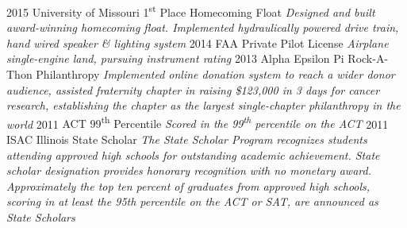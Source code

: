\documentclass[print]{gunn-resume}
\begin{document}
\begin{entrylist}
  \entry
    {2015}
    {University of Missouri 1\textsuperscript{st} Place Homecoming Float}
    {}
    {\emph{Designed and built award-winning homecoming float. Implemented hydraulically powered drive train, hand wired speaker \& lighting system}}
  \entry
    {2014}
    {FAA Private Pilot License}
    {}
    {\emph{Airplane single-engine land, pursuing instrument rating}}
  \entry
    {2013}
    {Alpha Epsilon Pi Rock-A-Thon Philanthropy}
    {}
    {\emph{Implemented online donation system to reach a wider donor audience, assisted  fraternity chapter in raising \$123,000 in 3 days for cancer research, establishing the chapter as the largest single-chapter philanthropy in the world}}
  \entry
    {2011}
    {ACT 99\textsuperscript{th} Percentile}
    {}
    {\emph{Scored in the 99\textsuperscript{th} percentile on the ACT}}
    \entry
    {2011}
    {ISAC Illinois State Scholar}
    {}
    {\emph{The State Scholar Program recognizes students attending approved high schools for outstanding academic achievement. State scholar designation provides honorary recognition with no monetary award. Approximately the top ten percent of graduates from approved high schools, scoring in at least the 95th percentile on the ACT or SAT, are announced as State Scholars}}
\end{entrylist}
\end{document}
